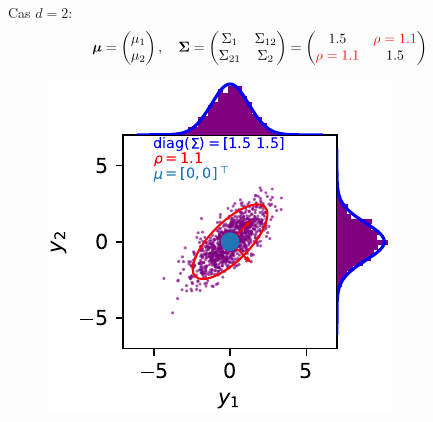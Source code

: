 \documentclass[xcolor=svgnames, t]{beamer}
\newcommand{\vectorx}[1]{\boldsymbol{\MakeLowercase{\mathbf{#1}}}}
\newcommand{\matrixx}[1]{\boldsymbol{\MakeUppercase{#1}}}
\begin{document}
\begin{frame}{\subsecname}
  Cas $d=2$:
  \begin{equation*}
    \vectorx{\mu}
    =
    \begin{pmatrix}
      \mu_1 \\
      \mu_2
    \end{pmatrix},
    \quad
    \matrixx{\Sigma}
    =
      \begin{pmatrix}
        \Sigma_{1} & \Sigma_{12} \\
        \Sigma_{21} & \Sigma_{2}
      \end{pmatrix}
    =
      \begin{pmatrix}
        1.5 & \color{red}\rho = 1.1 \\
        \color{red}\rho = 1.1 & 1.5
      \end{pmatrix}
  \end{equation*}
% 
  \begin{figure}
    \includegraphics{gaussian_2d_rho_high.pdf}
  \end{figure}
\end{frame}
\end{document}
